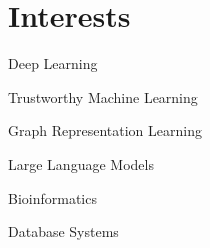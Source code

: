 
\section{Interests}\vspace{-1.0em}

\begin{multicols}{2}
	\begin{compactitem}
		\item {Deep Learning} 
		\item Trustworthy Machine Learning 
		\item Graph Representation Learning 
		\item Large Language Models 
		\item Bioinformatics
		\item Database Systems 
	\end{compactitem}
\end{multicols}
